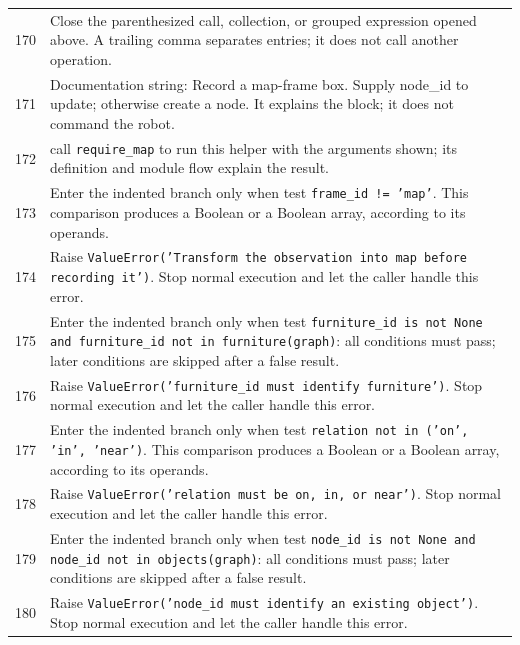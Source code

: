 \documentclass[11pt,a4paper]{book}
\begin{document}
\begin{longtable}{r p{}}
170 & Close the parenthesized call, collection, or grouped expression opened above. A trailing comma separates entries; it does not call another operation. \\

171 & Documentation string: Record a map-frame box. Supply node\_id to update; otherwise create a node. It explains the block; it does not command the robot. \\

172 & call \texttt{require\_map} to run this helper with the arguments shown; its definition and module flow explain the result. \\

173 & Enter the indented branch only when test \texttt{frame\_id != 'map'}. This comparison produces a Boolean or a Boolean array, according to its operands. \\

174 & Raise \texttt{ValueError('Transform the observation into map before recording it')}. Stop normal execution and let the caller handle this error. \\

175 & Enter the indented branch only when test \texttt{furniture\_id is not None and furniture\_id not in furniture(graph)}: all conditions must pass; later conditions are skipped after a false result. \\

176 & Raise \texttt{ValueError('furniture\_id must identify furniture')}. Stop normal execution and let the caller handle this error. \\

177 & Enter the indented branch only when test \texttt{relation not in ('on', 'in', 'near')}. This comparison produces a Boolean or a Boolean array, according to its operands. \\

178 & Raise \texttt{ValueError('relation must be on, in, or near')}. Stop normal execution and let the caller handle this error. \\

179 & Enter the indented branch only when test \texttt{node\_id is not None and node\_id not in objects(graph)}: all conditions must pass; later conditions are skipped after a false result. \\

180 & Raise \texttt{ValueError('node\_id must identify an existing object')}. Stop normal execution and let the caller handle this error. \\


\end{longtable}
\end{document}

